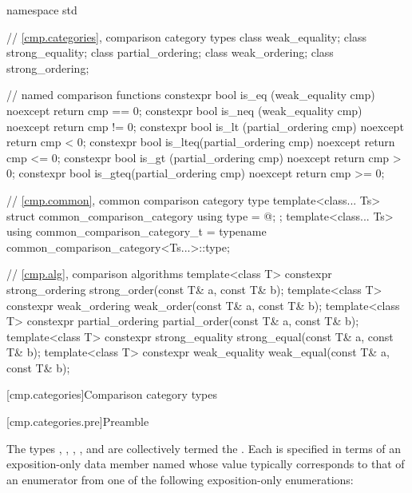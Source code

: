 %
%
%
%
%
%
%
%
%
\begin{codeblock}
namespace std {
  // \ref{cmp.categories}, comparison category types
  class weak_equality;
  class strong_equality;
  class partial_ordering;
  class weak_ordering;
  class strong_ordering;

  // named comparison functions
  constexpr bool is_eq  (weak_equality cmp) noexcept    { return cmp == 0; }
  constexpr bool is_neq (weak_equality cmp) noexcept    { return cmp != 0; }
  constexpr bool is_lt  (partial_ordering cmp) noexcept { return cmp < 0; }
  constexpr bool is_lteq(partial_ordering cmp) noexcept { return cmp <= 0; }
  constexpr bool is_gt  (partial_ordering cmp) noexcept { return cmp > 0; }
  constexpr bool is_gteq(partial_ordering cmp) noexcept { return cmp >= 0; }

  // \ref{cmp.common}, common comparison category type
  template<class... Ts>
  struct common_comparison_category {
    using type = @\seebelow@;
  };
  template<class... Ts>
    using common_comparison_category_t = typename common_comparison_category<Ts...>::type;

  // \ref{cmp.alg}, comparison algorithms
  template<class T> constexpr strong_ordering strong_order(const T& a, const T& b);
  template<class T> constexpr weak_ordering weak_order(const T& a, const T& b);
  template<class T> constexpr partial_ordering partial_order(const T& a, const T& b);
  template<class T> constexpr strong_equality strong_equal(const T& a, const T& b);
  template<class T> constexpr weak_equality weak_equal(const T& a, const T& b);
}
\end{codeblock}

[cmp.categories]{Comparison category types}

[cmp.categories.pre]{Preamble}

\pnum
The types
,
,
,
, and
are collectively termed the .
Each is specified in terms of an exposition-only data member named 
whose value typically corresponds to that of an enumerator
from one of the following exposition-only enumerations:

